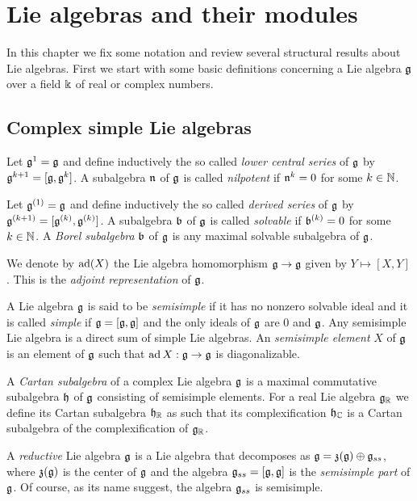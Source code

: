 \chapter{Lie algebras and their modules}

In this chapter we fix some notation and review several structural results about Lie algebras. First we start with some basic definitions concerning a Lie algebra $\mathfrak{g}$ over a field $\Bbbk$ of real or complex numbers.

\medskip

\section{Complex simple Lie algebras}

Let $\mathfrak{g}^{1} = \mathfrak{g}$ and define inductively the so called \emph{lower central series} of $\mathfrak{g}$ by $\mathfrak{g}^{k+1} = [\mathfrak{g},\mathfrak{g}^{k}]$.  A subalgebra $\mathfrak{n}$ of $\mathfrak{g}$ is called \emph{nilpotent} if $\mathfrak{n}^{k} = 0$ for some $k\in\mathbb{N}$.

Let $\mathfrak{g}^{(1)} = \mathfrak{g}$ and define inductively the so called \emph{derived series} of $\mathfrak{g}$ by $\mathfrak{g}^{(k+1)} = [\mathfrak{g}^{(k)},\mathfrak{g}^{(k)}]$.  A subalgebra $\mathfrak{b}$ of $\mathfrak{g}$ is called \emph{solvable} if $\mathfrak{b}^{(k)} = 0$ for some $k\in\mathbb{N}$. A \emph{Borel subalgebra} $\mathfrak{b}$ of $\mathfrak{g}$ is any maximal solvable subalgebra of $\mathfrak{g}$.


We denote by $\operatorname{\mathrm{ad}}(X)$ the Lie algebra homomorphism $\mathfrak{g}\to \mathfrak{g}$ given by $Y\mapsto [X,Y]$. This is the \emph{adjoint representation} of $\mathfrak{g}$.

A  Lie algebra $\mathfrak{g}$ is said to be \emph{semisimple} if it has no nonzero solvable ideal and it is called \emph{simple} if $\mathfrak{g} = [\mathfrak{g},\mathfrak{g}]$ and the only ideals of $\mathfrak{g}$ are $0$ and $\mathfrak{g}$. Any semisimple Lie algebra is a direct sum of simple Lie algebras. An \emph{semisimple element} $X$ of $\mathfrak{g}$ is an element of $\mathfrak{g}$ such that $\operatorname{\mathrm{ad}} X: \mathfrak{g} \to \mathfrak{g}$ is diagonalizable.

A \emph{Cartan subalgebra} of a complex Lie algebra $\mathfrak{g}$ is a maximal commutative subalgebra $\mathfrak{h}$ of $\mathfrak{g}$ consisting of semisimple elements. For a real Lie algebra $\mathfrak{g}_{\mathbb{R}}$ we define its Cartan subalgebra $\mathfrak{h}_{\mathbb{R}}$ as such that its complexification $\mathfrak{h}_{\mathbb{C}}$ is a Cartan subalgebra of the complexification of $\mathfrak{g}_{\mathbb{R}}$.

A \emph{reductive} Lie algebra $\mathfrak{g}$ is a Lie algebra that decomposes as $\mathfrak{g} = \mathfrak{z(g)} \oplus \mathfrak{g}_{ss}$, where $\mathfrak{z(g)}$ is the center of $\mathfrak{g}$ and the algebra $\mathfrak{g}_{ss} = [\mathfrak{g},\mathfrak{g}]$ is the \emph{semisimple part} of $\mathfrak{g}$. Of course, as its name suggest, the algebra $\mathfrak{g}_{ss}$ is semisimple.

